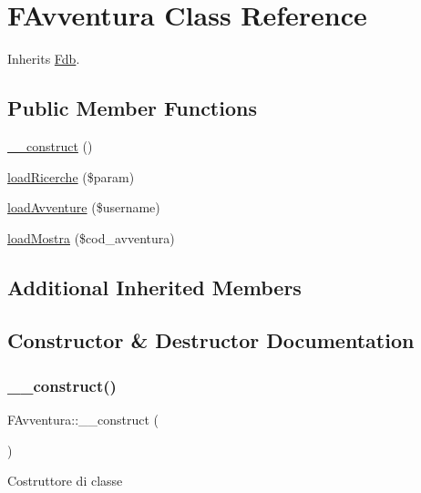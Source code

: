 \hypertarget{class_f_avventura}{}\section{F\+Avventura Class Reference}
\label{class_f_avventura}


Inherits \mbox{\hyperlink{class_fdb}{Fdb}}.

\subsection*{Public Member Functions}
\begin{DoxyCompactItemize}
\item 
\mbox{\hyperlink{class_f_avventura_ac343e12d6797fb78c672743d19c5ec96}{\+\_\+\+\_\+construct}} ()
\item 
\mbox{\hyperlink{class_f_avventura_a12a0c627090bf099850b89ab6b515e3a}{load\+Ricerche}} (\$param)
\item 
\mbox{\hyperlink{class_f_avventura_a11b7c09eb9588c5aa5b3fb9c7a69855a}{load\+Avventure}} (\$username)
\item 
\mbox{\hyperlink{class_f_avventura_aa73d72dc5bb5840a03b850e208ad4568}{load\+Mostra}} (\$cod\+\_\+avventura)
\end{DoxyCompactItemize}
\subsection*{Additional Inherited Members}


\subsection{Constructor \& Destructor Documentation}
\mbox{\label{class_f_avventura_ac343e12d6797fb78c672743d19c5ec96}} 
\subsubsection{\texorpdfstring{\+\_\+\+\_\+construct()}{\_\_construct()}}
{\footnotesize\ttfamily F\+Avventura\+::\+\_\+\+\_\+construct (\begin{DoxyParamCaption}{ }\end{DoxyParamCaption})}

Costruttore di classe 

